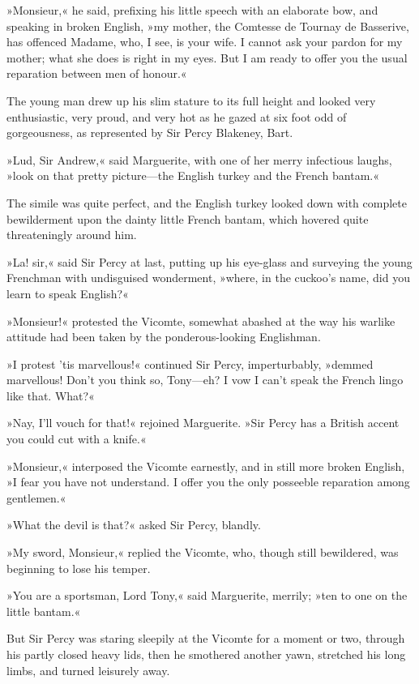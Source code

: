 »Monsieur,« he said, prefixing his little speech with an elaborate bow, and speaking in broken English, »my mother, the Comtesse de Tournay de Basserive, has offenced Madame, who, I see, is your wife. I cannot ask your pardon for my mother; what she does is right in my eyes. But I am ready to offer you the usual reparation between men of honour.«

The young man drew up his slim stature to its full height and looked very enthusiastic, very proud, and very hot as he gazed at six foot odd of gorgeousness, as represented by Sir Percy Blakeney, Bart.

»Lud, Sir Andrew,« said Marguerite, with one of her merry infectious laughs, »look on that pretty picture—the English turkey and the French bantam.«

The simile was quite perfect, and the English turkey looked down with complete bewilderment upon the dainty little French bantam, which hovered quite threateningly around him.

»La! sir,« said Sir Percy at last, putting up his eye-glass and surveying the young Frenchman with undisguised wonderment, »where, in the cuckoo's name, did you learn to speak English?«

»Monsieur!« protested the Vicomte, somewhat abashed at the way his warlike attitude had been taken by the ponderous-looking Englishman.

»I protest 'tis marvellous!« continued Sir Percy, imperturbably, »demmed marvellous! Don't you think so, Tony—eh? I vow I can't speak the French lingo like that. What?«

»Nay, I'll vouch for that!« rejoined Marguerite. »Sir Percy has a British accent you could cut with a knife.«

»Monsieur,« interposed the Vicomte earnestly, and in still more broken English, »I fear you have not understand. I offer you the only posseeble reparation among gentlemen.«

»What the devil is that?« asked Sir Percy, blandly.

»My sword, Monsieur,« replied the Vicomte, who, though still bewildered, was beginning to lose his temper.

»You are a sportsman, Lord Tony,« said Marguerite, merrily; »ten to one on the little bantam.«

But Sir Percy was staring sleepily at the Vicomte for a moment or two, through his partly closed heavy lids, then he smothered another yawn, stretched his long limbs, and turned leisurely away.

